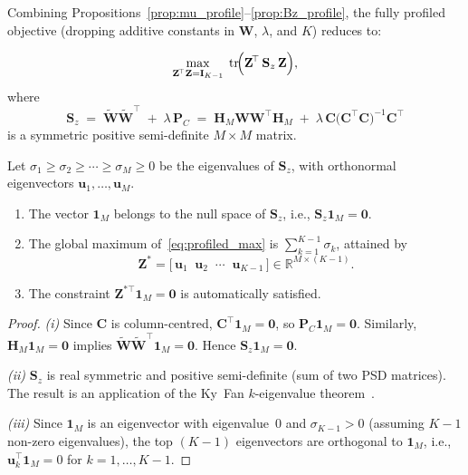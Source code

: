 Combining Propositions~\ref{prop:mu_profile}--\ref{prop:Bz_profile},
the fully profiled objective (dropping additive constants in
$\mathbf{W}$, $\lambda$, and $K$) reduces to:

\begin{equation}
  \max_{\mathbf{Z}^{\!\top}\mathbf{Z}=\mathbf{I}_{K-1}}\;
  \operatorname{tr}\!\Bigl(
    \mathbf{Z}^{\!\top}\,\mathbf{S}_z\,\mathbf{Z}
  \Bigr),
  \label{eq:profiled_max}
\end{equation}
where
\begin{equation}
  \boxed{\;
  \mathbf{S}_z
  \;=\;
  \widetilde{\mathbf{W}}\widetilde{\mathbf{W}}^{\!\top}
  \;+\;
  \lambda\,\mathbf{P}_C
  \;=\;
  \mathbf{H}_M\mathbf{W}\mathbf{W}^{\!\top}\mathbf{H}_M
  \;+\;
  \lambda\,\mathbf{C}
  \bigl(\mathbf{C}^{\!\top}\mathbf{C}\bigr)^{-1}
  \mathbf{C}^{\!\top}
  \;}
  \label{eq:Sz_matrix}
\end{equation}
is a symmetric positive semi-definite $M\times M$ matrix.

\begin{theorem}
\label{thm:spectral}
Let $\sigma_1\geq\sigma_2\geq\cdots\geq\sigma_M\geq 0$ be the
eigenvalues of $\mathbf{S}_z$, with orthonormal eigenvectors
$\mathbf{u}_1,\dots,\mathbf{u}_M$.
\begin{enumerate}
  \item[\emph{(i)}] The vector $\mathbf{1}_M$ belongs to the null space
    of $\mathbf{S}_z$, i.e.,
    $\mathbf{S}_z\mathbf{1}_M = \mathbf{0}$.
  \item[\emph{(ii)}] The global maximum
    of~\eqref{eq:profiled_max} is
    $\sum_{k=1}^{K-1}\sigma_k$, attained by
    \begin{equation}
      \mathbf{Z}^*
      = \bigl[\,\mathbf{u}_1\;\;\mathbf{u}_2\;\;\cdots\;\;
               \mathbf{u}_{K-1}\,\bigr]
      \in\mathbb{R}^{M\times(K-1)}.
      \label{eq:Z_star}
    \end{equation}
  \item[\emph{(iii)}] The constraint
    $\mathbf{Z}^{*\top}\mathbf{1}_M = \mathbf{0}$ is automatically
    satisfied.
\end{enumerate}
\end{theorem}

\begin{proof}
\emph{(i)} Since $\mathbf{C}$ is column-centred,
$\mathbf{C}^{\!\top}\mathbf{1}_M = \mathbf{0}$, so
$\mathbf{P}_C\mathbf{1}_M = \mathbf{0}$.
Similarly, $\mathbf{H}_M\mathbf{1}_M = \mathbf{0}$ implies
$\widetilde{\mathbf{W}}\widetilde{\mathbf{W}}^{\!\top}\mathbf{1}_M
= \mathbf{0}$. Hence $\mathbf{S}_z\mathbf{1}_M = \mathbf{0}$.

\emph{(ii)} $\mathbf{S}_z$ is real symmetric and positive semi-definite
(sum of two PSD matrices). The result is an application of the
Ky~Fan $k$-eigenvalue theorem~\citep{fan1949theorem}.

\emph{(iii)} Since $\mathbf{1}_M$ is an eigenvector with eigenvalue~0
and $\sigma_{K-1}>0$ (assuming $K{-}1$ non-zero eigenvalues), the top
$(K{-}1)$ eigenvectors are orthogonal to $\mathbf{1}_M$, i.e.,\
$\mathbf{u}_k^{\!\top}\mathbf{1}_M = 0$ for $k=1,\dots,K{-}1$.
\end{proof}

